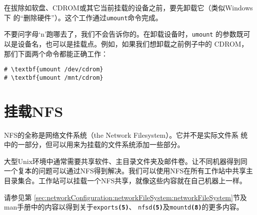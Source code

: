 在拔除如软盘、CDROM或其它当前挂载的设备之前，要先卸载它（类似Windows下
的``删除硬件''）。这个工作通过\texttt{umount}命令完成。

不要问字母`n'跑哪去了，我们不会告诉你的。在卸载设备时，\texttt{umount}
的参数既可以是设备名，也可以是挂载点。例如，如果我们想卸载之前例子中的
CDROM，那们下面两个命令都能正确工作：
\begin{Verbatim}[frame=single,commandchars=\\\{\}]
# \textbf{umount /dev/cdrom}
# \textbf{umount /mnt/cdrom}
\end{Verbatim}

\section{挂载NFS}
\label{sec:filesystemStructure:nfsMount}
NFS的全称是网络文件系统（the Network Filesystem）。它并不是实际文件系
统中的一部分，但可以用来为挂载的文件系统添加一些部分。

大型Unix环境中通常需要共享软件、主目录文件夹及邮件卷。让不同机器得到同
一个复本的问题可以通过NFS得到解决。我们可以使用NFS在所有工作站中共享主
目录集合。工作站可以挂载一个NFS共享，就像这些内容就在自己机器上一样。

请参见第
\ref{sec:networkConfiguration:networkFileSystem:networkFileSystem}节及
man手册中的内容以得到关于\texttt{exports\textbf{(5)}}、
\texttt{nfsd\textbf{(5)}}及\texttt{mountd\textbf{(8)}}的更多内容。

